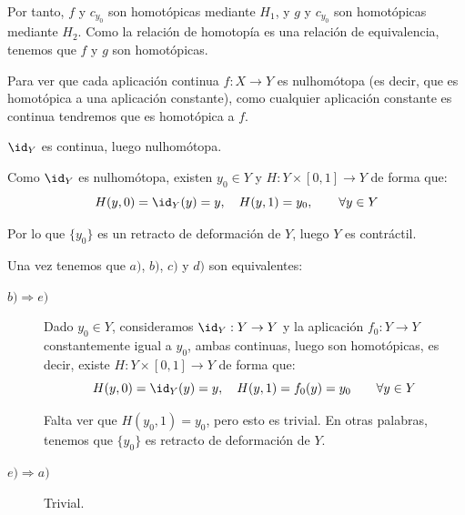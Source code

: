\begin{ejercicio}
\begin{description}
\begin{description}
                Por tanto, $f$ y $c_{y_0}$ son homotópicas mediante $H_1$, y $g$ y $c_{y_0}$ son homotópicas mediante $H_2$. Como la relación de homotopía es una relación de equivalencia, tenemos que $f$ y $g$ son homotópicas.
            \end{description}
        \item [$b)\Longrightarrow c)$] Para ver que cada aplicación continua $f:X\to Y$ es nulhomótopa (es decir, que es homotópica a una aplicación constante), como cualquier aplicación constante es continua tendremos que es homotópica a $f$.
        \item [$c)\Longrightarrow d)$] $\id_Y$ es continua, luego nulhomótopa.
        \item [$d)\Longrightarrow a)$] Como $\id_Y$ es nulhomótopa, existen $y_0 \in Y$ y $H:Y\times [0,1]\to Y$ de forma que:
            \begin{equation*}
                H(y,0) = \id_Y(y) = y, \quad H(y,1) = y_0, \qquad \forall y\in Y
            \end{equation*}

            Por lo que $\{y_0\}$ es un retracto de deformación de $Y$, luego $Y$ es contráctil.
    \end{description}
    Una vez tenemos que $a)$, $b)$, $c)$ y $d)$ son equivalentes:
    \begin{description}
        \item [$b)\Longrightarrow e)$] Dado $y_0\in Y$, consideramos $\id_Y:Y\to Y$ y la aplicación $f_0:Y\to Y$ constantemente igual a $y_0$, ambas continuas, luego son homotópicas, es decir, existe $H:Y\times [0,1]\to Y$ de forma que:
            \begin{equation*}
                H(y,0) = \id_Y(y) = y, \quad H(y,1) = f_0(y) = y_0 \qquad \forall y\in Y
            \end{equation*}

            Falta ver que $H(y_0,1) = y_0$, pero esto es trivial. En otras palabras, tenemos que $\{y_0\}$ es retracto de deformación de $Y$.
        \item [$e)\Longrightarrow a)$] Trivial.
    \end{description}
\end{ejercicio}

